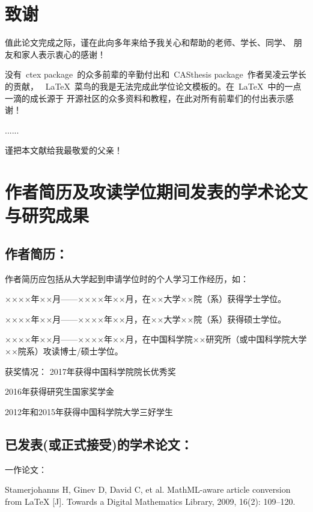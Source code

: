 \chapter{致\quad 谢}

值此论文完成之际，谨在此向多年来给予我关心和帮助的老师、学长、同学、
朋友和家人表示衷心的感谢！

没有~ctex package~的众多前辈的辛勤付出和~CASthesis package~作者吴凌云学长的贡献，
~\LaTeX{}~菜鸟的我是无法完成此学位论文模板的。在~\LaTeX{}~中的一点一滴的成长源于
开源社区的众多资料和教程，在此对所有前辈们的付出表示感谢！

......

谨把本文献给我最敬爱的父亲！




\chapter{作者简历及攻读学位期间发表的学术论文与研究成果}

\section*{作者简历：}

\noindent
作者简历应包括从大学起到申请学位时的个人学习工作经历，如：

\noindent
××××年××月——××××年××月，在××大学××院（系）获得学士学位。

\noindent
××××年××月——××××年××月，在××大学××院（系）获得硕士学位。

\noindent
××××年××月——××××年××月，在中国科学院××研究所（或中国科学院大学××院系）攻读博士/硕士学位。

\noindent
获奖情况： 2017年获得中国科学院院长优秀奖

\noindent
\quad\quad\quad\quad\quad 2016年获得研究生国家奖学金

\noindent
\quad\quad\quad\quad\quad 2012年和2015年获得中国科学院大学三好学生



\section*{已发表(或正式接受)的学术论文：}

\noindent
一作论文：
\setcounter{mycnt}{0}

\noindent
\stepaddpaper  Stamerjohanns H, Ginev D, David C, et al. MathML-aware article conversion from LaTeX [J]. Towards a Digital Mathematics Library, 2009, 16(2): 109–120.

